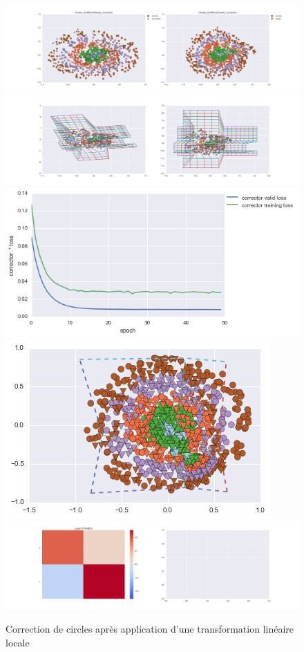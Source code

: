 \begin{figure}[H] %
\centering
\includegraphics[width=\linewidth]{fig/24-05-2016/circles/Circles_GridBendCluster_Corrector-DATA.png}
\includegraphics[width=\linewidth]{fig/24-05-2016/circles/Circles_GridBendCluster_Corrector-GridCheck.png}
\includegraphics[width=0.45\linewidth]{fig/24-05-2016/circles/Circles_GridBendCluster_Corrector-Learning_curve.png}
\includegraphics[width=0.45\linewidth]{fig/24-05-2016/circles/circles_grid.png}
\includegraphics[width=\linewidth]{fig/24-05-2016/circles/Circles_GridBendCluster_Corrector-W.png}
\caption{Correction de circles après application d'une transformation linéaire locale}
\label{fig:recap-circles-GridBend-cluster}
\end{figure}

